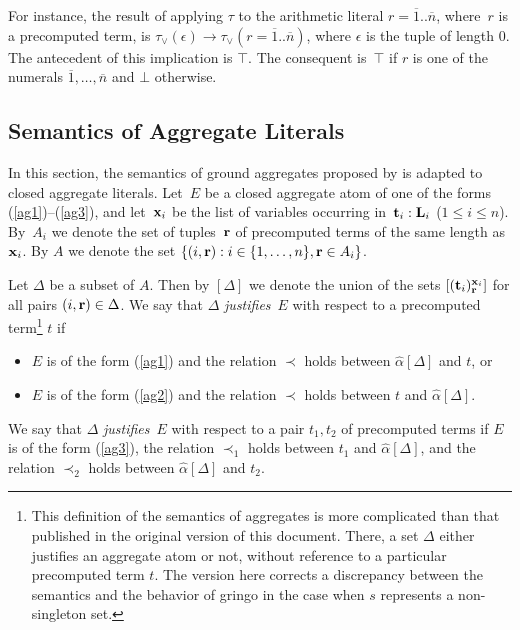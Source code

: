 \documentclass{tlp}
\def\rar{\rightarrow}
\begin{document}
For instance, the result of applying $\tau$ to the arithmetic literal
$r = \overline 1 .. \overline n$, where~$r$ is a precomputed term, is
$\tau_{\lor}(\epsilon) \rar \tau_{\lor}(r = \overline 1 .. \overline n)$, where
$\epsilon$ is the tuple of length $0$.
The antecedent of this implication is $\top$. The consequent is~$\top$ if
$r$ is one of the numerals $\overline 1, \dots, \overline n$ and $\bot$ otherwise.

\subsection{Semantics of Aggregate Literals}\label{sem:ag}

In this section, the semantics of ground aggregates proposed by
 \citeyear[Section~4.1]{fer05} is adapted to closed aggregate
literals.  Let~$E$
be a closed aggregate atom of one of the forms (\ref{ag1})--(\ref{ag3}), and
let~${\bf x}_i$ be the list of variables occurring in~${\bf t}_i:{\bf L}_i$
\hbox{($1\le i\le n$)}.  By~$A_i$ we denote the set of tuples~${\bf r}$ of
precomputed terms of the same length as~${\bf x}_i$.
By $A$ we denote the
set $\{(i, {\bf r}) : i \in \{1, \dots, n\}, {\bf r} \in A_i\}$.

Let $\Delta$ be a subset of $A$. Then by $[\Delta]$ we denote
the union of the sets $[({\bf t}_i)^{{\bf x}_i}_{\bf r}]$ for all pairs
$(i, {\bf r})\in\Delta$.
We say that $\Delta$ {\sl justifies}~$E$ with respect to a precomputed
term\footnote{This definition of the semantics of aggregates is
more complicated than that published in the original version of this document.
There, a set $\Delta$
either justifies an aggregate atom or not, without reference to a particular
precomputed term
$t$. The version here corrects a discrepancy between the semantics and the
behavior of {\sc gringo} in the case when $s$
represents a non-singleton set.\label{ft3a}
} $t$ if
\begin{itemize}
\item  $E$ is of the form (\ref{ag1}) and the relation $\prec$ holds
between $\widehat \alpha
[{\Delta}]$ and $t$,  or
\item $E$ is of the form (\ref{ag2}) and the relation $\prec$ holds between $t$ and
$\widehat \alpha [{\Delta}]$.
\end{itemize}
We say that $\Delta$ {\sl justifies}~$E$ with respect to a pair $t_1,t_2$ of precomputed
terms if
$E$ is of the
form (\ref{ag3}), the relation
$\prec_1$ holds between $t_1$ and $\widehat \alpha [\Delta]$, and the relation $\prec_2$ holds between $\widehat
\alpha [\Delta]$ and $t_2$.
\end{document}
